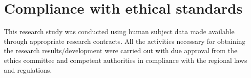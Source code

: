 \documentclass{article}
\begin{document}
\section{Compliance with ethical standards}
\label{sec:ethics}
This research study was conducted using human subject data made available through appropriate research contracts. All the activities necessary for obtaining the research results/development were carried out with due approval from the ethics committee and competent authorities in compliance with the regional laws and regulations.

	
	



%

\end{document}
